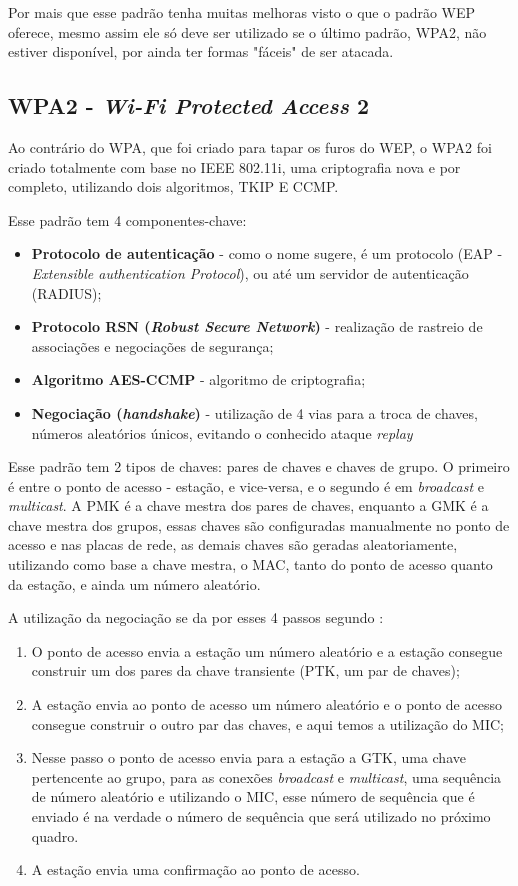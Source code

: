Por mais que esse padrão tenha muitas melhoras visto o que o padrão WEP oferece, mesmo assim ele só deve ser utilizado se o último padrão, WPA2, não estiver disponível, por ainda ter formas "fáceis" de ser atacada.

\subsection{WPA2 - \textit{Wi-Fi Protected Access} 2}

Ao contrário do WPA, que foi criado para tapar os furos do WEP, o WPA2 foi criado totalmente com base no IEEE 802.11i, uma criptografia nova e por completo, utilizando dois algoritmos, TKIP E CCMP.

Esse padrão tem 4 componentes-chave:

\begin{itemize}
\item \textbf{Protocolo de autenticação} - como o nome sugere, é um protocolo (EAP - \textit{Extensible authentication Protocol}), ou até um servidor de autenticação (RADIUS);
\item \textbf{Protocolo RSN (\textit{Robust Secure Network})} - realização de rastreio de associações e negociações de segurança;
\item \textbf{Algoritmo AES-CCMP} - algoritmo de criptografia;
\item \textbf{Negociação (\textit{handshake})} - utilização de 4 vias para a troca de chaves, números aleatórios únicos, evitando o conhecido ataque \textit{replay}
\end{itemize}

Esse padrão tem 2 tipos de chaves: pares de chaves e chaves de grupo. O primeiro é entre o ponto de acesso - estação, e vice-versa, e o segundo é em \textit{broadcast} e \textit{multicast}. A PMK é a chave mestra dos pares de chaves, enquanto a GMK é a chave mestra dos grupos, essas chaves são configuradas manualmente no ponto de acesso e nas placas de rede, as demais chaves são geradas aleatoriamente, utilizando como base a chave mestra, o MAC, tanto do ponto de acesso quanto da estação, e ainda um número aleatório.

A utilização da negociação se da por esses 4 passos segundo \cite{torres2015redes}:

\begin{enumerate}
\item O ponto de acesso envia a estação um número aleatório e a estação consegue construir um dos pares da chave transiente (PTK, um par de chaves);
\item A estação envia ao ponto de acesso um número aleatório e o ponto de acesso consegue construir o outro par das chaves, e aqui temos a utilização do MIC;
\item Nesse passo o ponto de acesso envia para a estação a GTK, uma chave pertencente ao grupo, para as conexões \textit{broadcast} e \textit{multicast}, uma sequência de número aleatório e utilizando o MIC, esse número de sequência que é enviado é na verdade o número de sequência que será utilizado no próximo quadro.
\item A estação envia uma confirmação ao ponto de acesso.
\end{enumerate}

